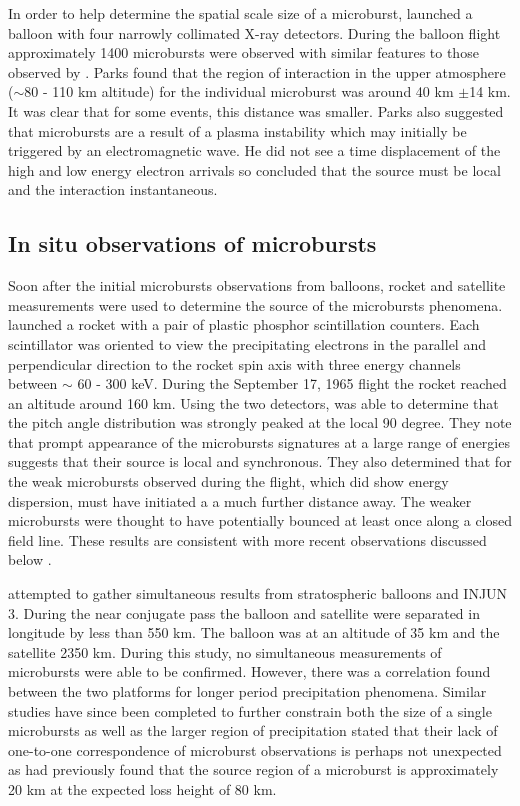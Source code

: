 \documentclass[referee,a4paper,12pt,traditabstract]{swsc}
\begin{document}
\begin{linenumbers}
In order to help determine the spatial scale size of a microburst, \citet{Parks1967} launched a balloon with four narrowly collimated X-ray detectors. During the balloon flight approximately 1400 microbursts were observed with similar features to those observed by \citet{Anderson1964}. Parks found that the region of interaction in the upper atmosphere ($\sim $80 - 110 km altitude) for the individual microburst was around 40 km $\pm$14 km. It was clear that for some events, this distance was smaller. Parks also suggested that microbursts are a result of a plasma instability which may initially be triggered by an electromagnetic wave. He did not see a time displacement of the high and low energy electron arrivals so concluded that the source must be local and the interaction instantaneous. 


\subsection{In situ observations of microbursts}
Soon after the initial microbursts observations from balloons, rocket and satellite measurements were used to determine the source of the microbursts phenomena. \citet{Lampton1967} launched a rocket with a pair of plastic phosphor scintillation counters. Each scintillator was oriented to view the precipitating electrons in the parallel and perpendicular direction to the rocket spin axis with three energy channels between $\sim$ 60 - 300 keV. During the September 17, 1965 flight the rocket reached an altitude around 160 km. Using the two detectors, \citet{Lampton1967} was able to determine that the pitch angle distribution was strongly peaked at the local 90 degree. They note that prompt appearance of the microbursts signatures at a large range of energies suggests that their source is local and synchronous. They also determined that for the weak microbursts observed during the flight, which did show energy dispersion, must have initiated a a much further distance away. The weaker microbursts were thought to have potentially bounced at least once along a closed field line. These results are consistent with more recent observations discussed below \citep[e.g.][]{Shumko2018a}.  

\citet{Milton1967} attempted to gather simultaneous results from stratospheric balloons and INJUN 3. During the near conjugate pass the balloon and satellite were separated in longitude by less than 550 km. The balloon was at an altitude of 35 km and the satellite 2350 km. During this study, no simultaneous measurements of microbursts were able to be confirmed. However, there was a correlation found between the two platforms for longer period precipitation phenomena. Similar studies have since been completed to further constrain both the size of a single microbursts as well as the larger region of precipitation \citet{Milton1967, Breneman2015, Halford2015, Anderson2017, Clilverd2017} stated that their lack of one-to-one correspondence of microburst observations is perhaps not unexpected as \citet{Parks1967} had previously found that the source region of a microburst is approximately 20 km at the expected loss height of 80 km. 


\end{linenumbers}
\end{document}
